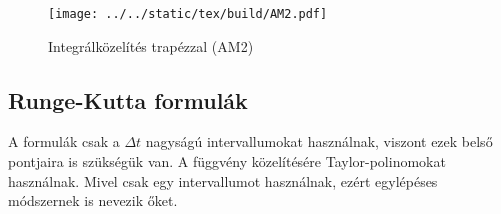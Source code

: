 \documentclass[../../main.tex]{subfiles}
\begin{document}
\begin{figure}[H]
  \centering
  \texttt{[image: ../../static/tex/build/AM2.pdf]}
  \caption{Integrálközelítés trapézzal (AM2)}
  \label{fig:AM2}
\end{figure}


\subsection{Runge-Kutta formulák}

A  formulák csak a $\Delta t$ nagyságú intervallumokat
használnak, viszont ezek belső pontjaira is szükségük van. A függvény
közelítésére Taylor-polinomokat használnak. Mivel csak egy intervallumot
használnak, ezért egylépéses módszernek is nevezik őket.
\end{document}

